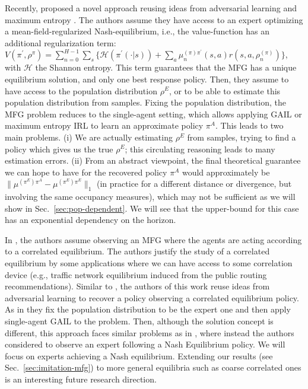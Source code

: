 \documentclass{article}
\begin{document}
Recently, \cite{chen2021adversarial} proposed a novel approach reusing ideas from adversarial learning \cite{ho2016generative} and maximum entropy \cite{ziebart2008maximum}. 
The authors assume they have access to an expert optimizing a mean-field-regularized Nash-equilibrium, i.e., the value-function has an additional regularization term: $V(\pi^{\prime},\rho^{\pi})=\sum_{n=0}^{H-1}\sum_{s}\big\{\mathcal{H}(\pi^{\prime}(\cdot|s))+\sum_{a}\mu_{n}^{(\pi)\pi^{\prime}}(s,a)r(s,a,\rho_{n}^{(\pi)})\big\}$, %
with $\mathcal{H}$ the Shannon entropy.
This term guarantees that the MFG has a unique equilibrium solution, and  only one best response policy.  
Then, they assume to have access to the population distribution $\rho^E$, or to be able to estimate this population distribution from samples. 
Fixing the population distribution, the MFG problem reduces to the single-agent setting, which allows applying GAIL \cite{ho2016generative} or maximum entropy IRL to learn an approximate policy $\pi^A$. 
This leads to two main problems. (i) We are actually estimating $\rho^E$ from samples, trying to find a policy which gives us the true $\rho^E$; this circulating reasoning leads to many estimation errors. (ii) From an abstract viewpoint, the final theoretical guarantee we can hope to have for the recovered policy $\pi^A$ would approximately be $\|\mu^{(\pi^E)\pi^A} - \mu^{(\pi^E)\pi^E}\|_1$ (in practice for a different distance or divergence, but involving the same occupancy measures), which may not be sufficient as we will show in Sec.~\ref{sec:pop-dependent}. 
We will see that the upper-bound for this case has an exponential dependency on the horizon. 

In \cite{zhao2023imitation}, the authors assume observing an MFG where the agents are acting according to a correlated equilibrium. The authors justify the study of a correlated equilibrium by some applications  where we can have access to some correlation device (e.g., traffic network equilibrium induced from the public routing recommendations). 
Similar to \cite{chen2021adversarial}, the authors of this work reuse ideas from adversarial learning \cite{ho2016generative} to recover a policy observing a correlated equilibrium policy. As in \cite{chen2021adversarial} they fix the population distribution to be the expert one and then apply single-agent GAIL to the problem. Then, although the solution concept is different, this approach faces similar problems as in \cite{chen2021adversarial}, where instead the authors considered to observe an expert following a Nash Equilibrium policy. 
We will focus on experts achieving a Nash equilibrium. Extending our results (see Sec.~\ref{sec:imitation-mfg}) to more general equilibria such as coarse correlated ones is an interesting future research direction.
\end{document}
